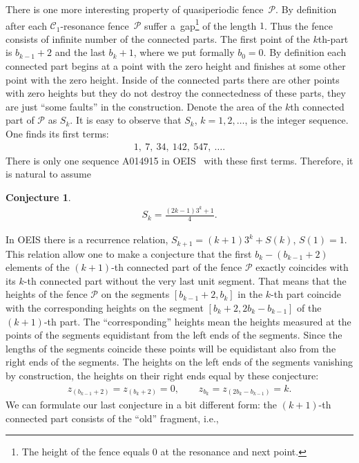 \documentclass[pdftex]{sigma}
\numberwithin{equation}{section}
\newtheorem{Conjecture}[Theorem]{Conjecture}
\begin{document}
There is one more interesting property of quasiperiodic fence~$\mathcal{P}$. By definition after each
$\mathcal{C}_1$-resonance fence~$\mathcal{P}$ suffer a~gap\footnote{The height of the fence equals $0$ at the resonance and next point.} of the length $1$. Thus the fence
consists of infinite number of the connected parts. The first point of the $k$th-part is $b_{k-1}+2$ and the last
$b_{k}+1$, where we put formally $b_0=0$. By definition each connected part begins at a point with the zero height
and finishes at some other point with the zero height. Inside of the connected parts there are other points with
zero heights but they do not destroy the connectedness of these parts, they are just ``some faults'' in the
construction. Denote the area of the $k$th connected part of $\mathcal{P}$ as $S_k$. It is easy to observe that
$S_k$, $k=1,2,\ldots$, is the integer sequence. One finds its first terms:
\begin{gather*}
1, \ 7, \ 34, \ 142, \ 547, \ \ldots.
\end{gather*}
There is only one sequence A014915 in OEIS~\cite{OEIS} with these first terms. Therefore, it is natural to assume
\begin{Conjecture}
\begin{gather*}
S_k=\frac{(2k-1)3^k + 1}4.
\end{gather*}
\end{Conjecture}
In OEIS there is a recurrence relation, $S_{k+1}=(k+1)3^k+S(k)$, $S(1)=1$. This relation allow one to make
a conjecture that the first $b_k-(b_{k-1}+2)$ elements of the $(k+1)$-th connected part of the fence $\mathcal{P}$
exactly coincides with its $k$-th connected part without the very last unit segment. That means that the heights of
the fence $\mathcal{P}$ on the segments $[b_{k-1}+2, b_k]$ in the $k$-th part coincide with the corresponding
heights on the segment $[b_k+2,2b_k-b_{k-1}]$ of the $(k+1)$-th part. The ``corresponding'' heights mean the heights
measured at the points of the segments equidistant from the left ends of the segments. Since the lengths of the
segments coincide these points will be equidistant also from the right ends of the segments. The heights on the
left ends of the segments vanishing by construction, the heights on their right ends equal by these conjecture:
\begin{gather*}
z_{(b_{k-1}+2)}=z_{(b_k+2)}=0,\qquad z_{b_k}=z_{(2b_k-b_{k-1})}=k.
\end{gather*}
We can formulate our last conjecture in a bit different form: the $(k+1)$-th connected part consists of the ``old'' fragment, i.e.,
\end{document}
